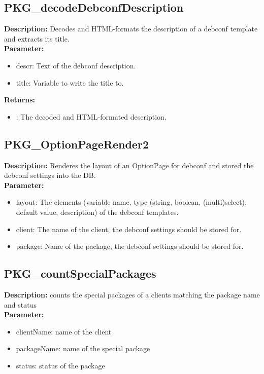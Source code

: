 \subsection{PKG\_decodeDebconfDescription}
\textbf{Description:} Decodes and HTML-formats the description of a debconf template and extracts its title.\\
\textbf{Parameter:}
\begin{itemize}
\item descr: Text of the debconf description.
\item title: Variable to write the title to.
\end{itemize}
\textbf{Returns:}
\begin{itemize}
\item : The decoded and HTML-formated description.
\end{itemize}

\subsection{PKG\_OptionPageRender2}
\textbf{Description:} Renderes the layout of an OptionPage for debconf and stored the debconf settings into the DB.\\
\textbf{Parameter:}
\begin{itemize}
\item layout: The elements (variable name, type (string, boolean, (multi)select), default value, description) of the debconf templates.
\item client: The name of the client, the debconf settings should be stored for.
\item package: Name of the package, the debconf settings should be stored for.
\end{itemize}

\subsection{PKG\_countSpecialPackages}
\textbf{Description:} counts the special packages of a clients matching the package name and status\\
\textbf{Parameter:}
\begin{itemize}
\item clientName: name of the client 
\item packageName: name of the special package
\item status: status of the package
\end{itemize}

